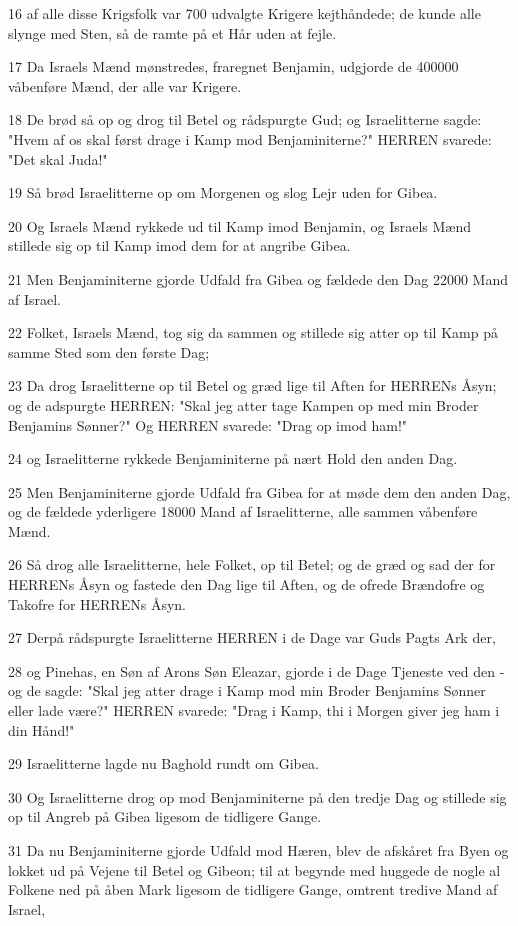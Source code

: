 \par 16 af alle disse Krigsfolk var 700 udvalgte Krigere kejthåndede; de kunde alle slynge med Sten, så de ramte på et Hår uden at fejle.
\par 17 Da Israels Mænd mønstredes, fraregnet Benjamin, udgjorde de 400000 våbenføre Mænd, der alle var Krigere.
\par 18 De brød så op og drog til Betel og rådspurgte Gud; og Israelitterne sagde: "Hvem af os skal først drage i Kamp mod Benjaminiterne?" HERREN svarede: "Det skal Juda!"
\par 19 Så brød Israelitterne op om Morgenen og slog Lejr uden for Gibea.
\par 20 Og Israels Mænd rykkede ud til Kamp imod Benjamin, og Israels Mænd stillede sig op til Kamp imod dem for at angribe Gibea.
\par 21 Men Benjaminiterne gjorde Udfald fra Gibea og fældede den Dag 22000 Mand af Israel.
\par 22 Folket, Israels Mænd, tog sig da sammen og stillede sig atter op til Kamp på samme Sted som den første Dag;
\par 23 Da drog Israelitterne op til Betel og græd lige til Aften for HERRENs Åsyn; og de adspurgte HERREN: "Skal jeg atter tage Kampen op med min Broder Benjamins Sønner?" Og HERREN svarede: "Drag op imod ham!"
\par 24 og Israelitterne rykkede Benjaminiterne på nært Hold den anden Dag.
\par 25 Men Benjaminiterne gjorde Udfald fra Gibea for at møde dem den anden Dag, og de fældede yderligere 18000 Mand af Israelitterne, alle sammen våbenføre Mænd.
\par 26 Så drog alle Israelitterne, hele Folket, op til Betel; og de græd og sad der for HERRENs Åsyn og fastede den Dag lige til Aften, og de ofrede Brændofre og Takofre for HERRENs Åsyn.
\par 27 Derpå rådspurgte Israelitterne HERREN i de Dage var Guds Pagts Ark der,
\par 28 og Pinehas, en Søn af Arons Søn Eleazar, gjorde i de Dage Tjeneste ved den - og de sagde: "Skal jeg atter drage i Kamp mod min Broder Benjamins Sønner eller lade være?" HERREN svarede: "Drag i Kamp, thi i Morgen giver jeg ham i din Hånd!"
\par 29 Israelitterne lagde nu Baghold rundt om Gibea.
\par 30 Og Israelitterne drog op mod Benjaminiterne på den tredje Dag og stillede sig op til Angreb på Gibea ligesom de tidligere Gange.
\par 31 Da nu Benjaminiterne gjorde Udfald mod Hæren, blev de afskåret fra Byen og lokket ud på Vejene til Betel og Gibeon; til at begynde med huggede de nogle al Folkene ned på åben Mark ligesom de tidligere Gange, omtrent tredive Mand af Israel,
